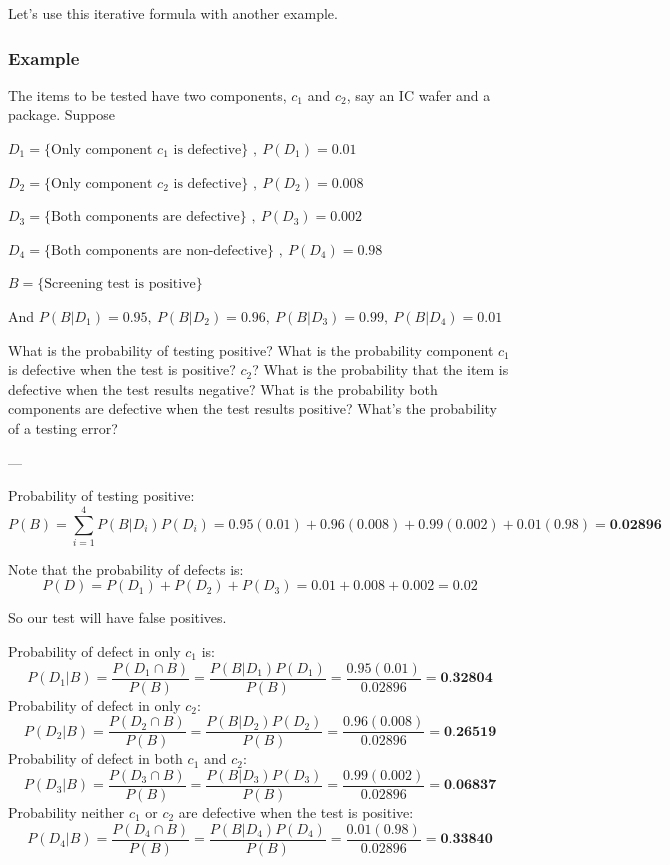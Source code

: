 \documentclass{article}
\begin{document}
Let's use this iterative formula with another example.

\subsubsection*{Example}

The items to be tested have two components, $c_1$ and $c_2$, say an IC wafer and a package. Suppose 

$D_1 = \{ \text{Only component}$ $c_1$  $\text{is defective} \} $ $,\ P(D_1) = 0.01$ 

$D_2 = \{ \text{Only component}$ $c_2$  $\text{is defective} \} $ $,\ P(D_2) = 0.008$ 

$D_3 = \{ \text{Both components are defective} \} $ $,\ P(D_3) = 0.002$ 

$D_4 = \{ \text{Both components are non-defective} \} $ $,\ P(D_4) = 0.98$ 

$B = \{ \text{Screening test is positive} \} $ 

And $P(B|D_1) = 0.95,\ P(B|D_2) = 0.96,\ P(B|D_3) = 0.99,\ P(B|D_4) = 0.01$

What is the probability of testing positive? What is the probability component $c_1$ is defective when the test is positive? $c_2$? What is the probability that the item is defective when the test results negative? What is the probability both components are defective when the test results positive? What's the probability of a testing error?

---

Probability of testing positive: $$ P(B) = \sum_{i=1}^4 P(B|D_i)P(D_i) = 0.95(0.01) + 0.96(0.008) + 0.99(0.002) + 0.01(0.98) = \textbf{0.02896}$$

Note that the probability of defects is: $$P(D) = P(D_1) + P(D_2) + P(D_3) = 0.01 + 0.008 + 0.002 = 0.02$$

So our test will have false positives.

Probability of defect in only $c_1$ is:$$P(D_1|B) = \frac{P(D_1 \cap B)}{P(B)} = \frac{P(B|D_1)P(D_1)}{P(B)} =  \frac{0.95(0.01)}{0.02896} = \textbf{0.32804}$$
Probability of defect in only $c_2$: $$P(D_2|B) = \frac{P(D_2 \cap B)}{P(B)} = \frac{P(B|D_2)P(D_2)}{P(B)} =  \frac{0.96(0.008)}{0.02896} = \textbf{0.26519}$$
Probability of defect in both $c_1$ and $c_2$:
$$P(D_3|B) = \frac{P(D_3 \cap B)}{P(B)} = \frac{P(B|D_3)P(D_3)}{P(B)} =  \frac{0.99(0.002)}{0.02896} = \textbf{0.06837}$$
Probability neither $c_1$ or $c_2$ are defective when the test is positive: $$P(D_4|B) = \frac{P(D_4 \cap B)}{P(B)} = \frac{P(B|D_4)P(D_4)}{P(B)} =  \frac{0.01(0.98)}{0.02896} = \textbf{0.33840}$$
\end{document}
